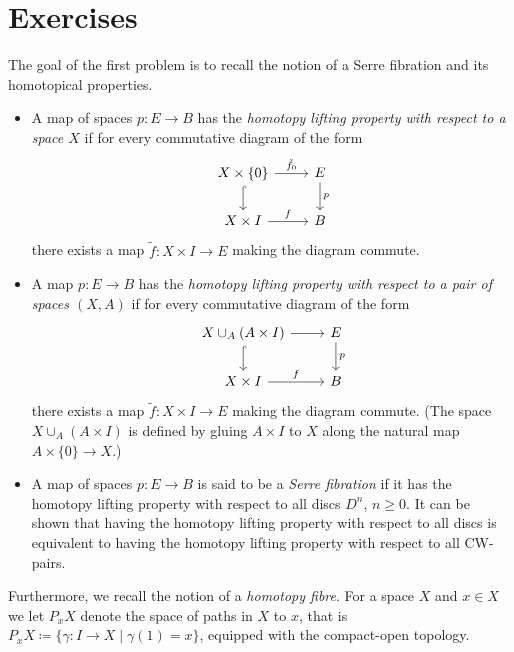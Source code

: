 \section{Exercises}
\begin{exercise}\label{ex:serrefib}
	The goal of the first problem is to recall the notion of a Serre fibration and its homotopical properties.
	\begin{itemize}
		\item A map of spaces $p\colon E \to B$ has the \emph{homotopy lifting property with respect to a space $X$} if for every commutative diagram of the form
			\begin{equation*}
				\begin{tikzcd}
					X \times \{0\} 
							\ar[r, "\tilde{f}_0"]
							\ar[d, hook]
						& E
							\ar[d, "p"]
					\\
					X \times I
							\ar[r, "f"]
						& B
				\end{tikzcd}
			\end{equation*}
			there exists a map $\tilde{f}\colon X \times I \to E$ making the diagram commute.
		\item A map $p\colon E \to B$ has the \emph{homotopy lifting property with respect to a pair of spaces $(X, A)$} if for every commutative diagram of the form
			\begin{equation*}
				\begin{tikzcd}
					X \cup_A (A \times I)
							\ar[r]
							\ar[d, hook]
						& E
							\ar[d, "p"]
					\\
					X \times I
							\ar[r, "f"]
						& B
				\end{tikzcd}
			\end{equation*}
			there exists a map $\tilde{f}\colon X \times I \to E$ making the diagram commute. (The space $X \cup_A (A \times I)$ is defined by gluing $A \times I$ to $X$ along the natural map $A \times \{0\} \to X$.)
		\item A map of spaces $p\colon E \to B$ is said to be a \emph{Serre fibration} if it has the homotopy lifting property with respect to all discs $D^n$, $n \geq 0$.
			It can be shown that having the homotopy lifting property with respect to all discs is equivalent to having the homotopy lifting property with respect to all CW-pairs.
	\end{itemize}
	Furthermore, we recall the notion of a \emph{homotopy fibre}.
	For a space $X$ and $x \in X$ we let $P_x X$ denote the space of paths in $X$ to $x$, that is $P_x X \coloneq \{\gamma\colon I \to X \mid \gamma(1) = x\}$, equipped with the compact-open topology.

\end{exercise}
